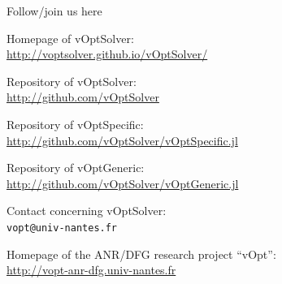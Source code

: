 \documentclass[10pt,xcolor=dvipsnames]{beamer}
\begin{document}
\begin{frame}{Follow/join us here}



{

Homepage of vOptSolver:\\
         \url{http://voptsolver.github.io/vOptSolver/}


\quad Repository of vOptSolver:\\
\quad         \url{http://github.com/vOptSolver}
         
\quad Repository of vOptSpecific:\\
\quad         \url{http://github.com/vOptSolver/vOptSpecific.jl}

\quad Repository of vOptGeneric:\\
\quad         \url{http://github.com/vOptSolver/vOptGeneric.jl}              




Contact concerning vOptSolver:\\
         \texttt{vopt@univ-nantes.fr}  \\
\vspace{4mm}

Homepage of the ANR/DFG research project ``vOpt'': \\
         \url{http://vopt-anr-dfg.univ-nantes.fr}


}

\end{frame}
\end{document}
